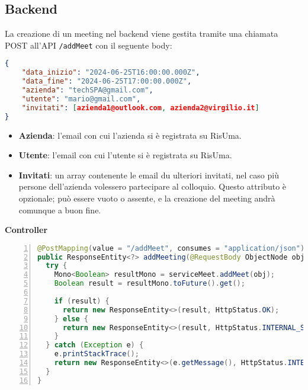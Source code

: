 \subsection{Backend}
La creazione di un meeting nel backend viene gestita tramite una chiamata POST all'API \texttt{\//addMeet} con il seguente body:
\begin{lstlisting}[language=json,firstnumber=1]
{
    "data_inizio": "2024-06-25T16:00:00.000Z", 
    "data_fine": "2024-06-25T17:00:00.000Z",   
    "azienda": "techSPA@gmail.com", 
    "utente": "mario@gmail.com",
    "invitati": [azienda1@outlook.com, azienda2@virgilio.it]
}
\end{lstlisting}
\begin{itemize}
    \item \textbf{Azienda}: l'email con cui l'azienda si è registrata su RisUma.
    \item \textbf{Utente}: l'email con cui l'utente si è registrata su RisUma.
    \item \textbf{Invitati}: un array contenente le email du ulteriori invitati, nel caso più persone dell'azienda volessero 
    partecipare al colloquio. Questo attributo è opzionale; può essere vuoto o assente, e la creazione del meeting andrà comunque a buon fine.
\end{itemize}
\vspace{0.2cm}
{\large \textbf{Controller}}
\begin{lstlisting}[language=java, frame=lines, basicstyle=\ttfamily\scriptsize, numbers=left]
@PostMapping(value = "/addMeet", consumes = "application/json")
public ResponseEntity<?> addMeeting(@RequestBody ObjectNode obj) {
  try {
	Mono<Boolean> resultMono = serviceMeet.addMeet(obj);
	Boolean result = resultMono.toFuture().get();

	if (result) {
	  return new ResponseEntity<>(result, HttpStatus.OK);
	} else {
	  return new ResponseEntity<>(result, HttpStatus.INTERNAL_SERVER_ERROR);
	}
  } catch (Exception e) {
	e.printStackTrace();
	return new ResponseEntity<>(e.getMessage(), HttpStatus.INTERNAL_SERVER_ERROR);
  }
}    
\end{lstlisting}

